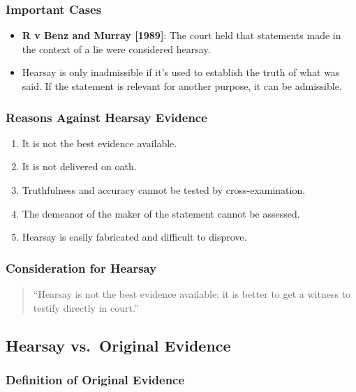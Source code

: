 \subsubsection{Important Cases}\label{important-cases-3}

\begin{itemize}
\tightlist
\item
  \textbf{R v Benz and Murray {[}1989{]}}: The court held that
  statements made in the context of a lie were considered hearsay.
\item
  Hearsay is only inadmissible if it's used to establish the truth of
  what was said. If the statement is relevant for another purpose, it
  can be admissible.
\end{itemize}

\subsubsection{Reasons Against Hearsay
Evidence}\label{reasons-against-hearsay-evidence}

\begin{enumerate}
\def\labelenumi{\arabic{enumi}.}
\tightlist
\item
  It is not the best evidence available.
\item
  It is not delivered on oath.
\item
  Truthfulness and accuracy cannot be tested by cross-examination.
\item
  The demeanor of the maker of the statement cannot be assessed.
\item
  Hearsay is easily fabricated and difficult to disprove.
\end{enumerate}

\subsubsection{Consideration for
Hearsay}\label{consideration-for-hearsay}

\begin{quote}
``Hearsay is not the best evidence available; it is better to get a
witness to testify directly in court.''
\end{quote}

\subsection{  Hearsay vs.~Original
Evidence}\label{hearsay-vs.-original-evidence}

\subsubsection{Definition of Original
Evidence}\label{definition-of-original-evidence}


